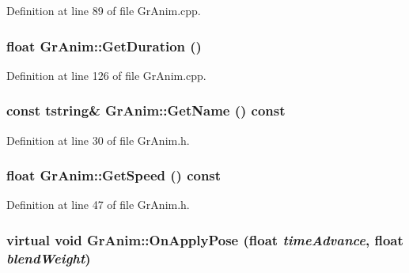 Definition at line 89 of file GrAnim.cpp.\hypertarget{class_gr_anim_6863fbadf721b2848290a320b617dc78}{
\subsubsection[{GetDuration}]{\setlength{\rightskip}{0pt plus 5cm}float GrAnim::GetDuration ()}}
\label{class_gr_anim_6863fbadf721b2848290a320b617dc78}




Definition at line 126 of file GrAnim.cpp.\hypertarget{class_gr_anim_16847f80539915f15a8670858cc08461}{
\subsubsection[{GetName}]{\setlength{\rightskip}{0pt plus 5cm}const {\bf tstring}\& GrAnim::GetName () const}}
\label{class_gr_anim_16847f80539915f15a8670858cc08461}




Definition at line 30 of file GrAnim.h.\hypertarget{class_gr_anim_de03c33c2cb87f9b72243afc77504973}{
\subsubsection[{GetSpeed}]{\setlength{\rightskip}{0pt plus 5cm}float GrAnim::GetSpeed () const}}
\label{class_gr_anim_de03c33c2cb87f9b72243afc77504973}




Definition at line 47 of file GrAnim.h.\hypertarget{class_gr_anim_dec6db03770e91d166da4c5f87882a39}{
\subsubsection[{OnApplyPose}]{\setlength{\rightskip}{0pt plus 5cm}virtual void GrAnim::OnApplyPose (float {\em timeAdvance}, \/  float {\em blendWeight})}}
\label{class_gr_anim_dec6db03770e91d166da4c5f87882a39}




